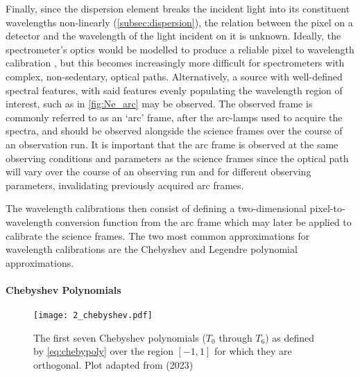 Finally, since the dispersion element breaks the incident light into its constituent wavelengths non-linearly (\autoref{subsec:dispersion}), the relation between the pixel on a detector and the wavelength of the light incident on it is unknown. Ideally, the spectrometer's optics would be modelled to produce a reliable pixel to wavelength calibration \citep[see E.g.][]{WavCalSpectraModel}, but this becomes increasingly more difficult for spectrometers with complex, non-sedentary, optical paths. Alternatively, a source with well-defined spectral features, with said features evenly populating the wavelength region of interest, such as in \autoref{fig:Ne_arc} may be observed. The observed frame is commonly referred to as an `arc' frame, after the arc-lamps used to acquire the spectra, and should be observed alongside the science frames over the course of an observation run. It is important that the arc frame is observed at the same observing conditions and parameters as the science frames since the optical path will vary over the course of an observing run and for different observing parameters, invalidating previously acquired arc frames.

The wavelength calibrations then consist of defining a two-dimensional pixel-to-wave\-length conversion function from the arc frame which may later be applied to calibrate the science frames. The two most common approximations for wavelength calibrations are the Chebyshev and Legendre polynomial approximations.

\paragraph{Chebyshev Polynomials}

\begin{figure}[t]
    \centering
    \texttt{[image: 2\_chebyshev.pdf]}
    \caption{The first seven Chebyshev polynomials ($T_0$ through $T_{6}$) as defined by \autoref{eq:chebypoly} over the region $[-1, 1]$ for which they are orthogonal. Plot adapted from \citep{numerical_recipes} (2023)\protect\footnotemark}
    \label{fig:chebyshev}
\end{figure}

